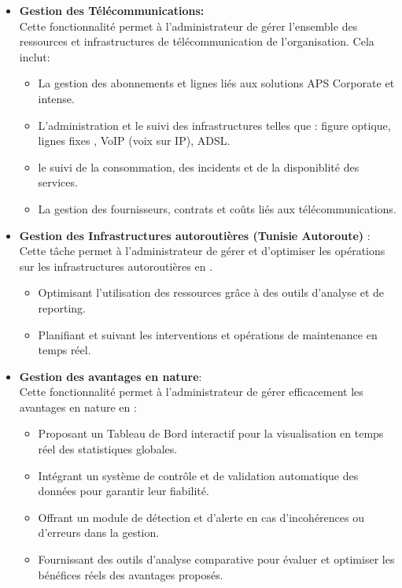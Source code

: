\documentclass[a4paper,11pt]{report}
\begin{document}
\begin{itemize}
\begin{itemize}
	\item \textbf{Gestion des Télécommunications: }\\
Cette fonctionnalité permet à l'administrateur de gérer l'ensemble des ressources et infrastructures de télécommunication de l'organisation. Cela inclut: 
\begin{itemize}
	\item La gestion des abonnements et lignes liés aux solutions APS Corporate et intense.
	\item L'administration et le suivi des infrastructures telles que : figure optique, lignes fixes , VoIP (voix sur IP), ADSL.
	\item le suivi de la consommation, des incidents et de la disponiblité des services.
	\item La gestion des fournisseurs, contrats et coûts liés aux télécommunications.\\
\end{itemize}


	\item \textbf{Gestion des Infrastructures autoroutières (Tunisie Autoroute)} : \\
Cette tâche permet à l'administrateur de gérer et d'optimiser les opérations sur les infrastructures autoroutières en .
	\begin{itemize}
		\item Optimisant l'utilisation des ressources grâce à des outils d'analyse et de reporting.
		\item Planifiant et suivant les interventions et opérations de maintenance en temps réel.\\
		\newline
		\newline
		\newline
	\end{itemize}
	
	\item \textbf{Gestion  des avantages en nature}:\\
	Cette fonctionnalité permet à l'administrateur de gérer efficacement les avantages en nature en :
	\begin{itemize}
		\item Proposant un Tableau de Bord interactif pour la visualisation en temps réel des statistiques globales.
		\item Intégrant un système de contrôle et de validation automatique des données pour garantir leur fiabilité.
		\item Offrant un module de détection et d'alerte en cas d'incohérences ou d'erreurs dans la gestion.
		\item Fournissant des outils d'analyse comparative pour évaluer et optimiser les bénéfices réels des avantages proposés.
	\end{itemize}


\end{itemize}
\end{itemize}
\end{document}
